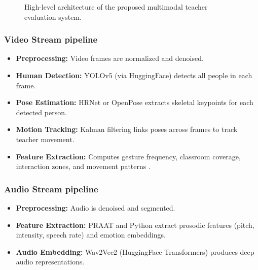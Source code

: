 \begin{figure}[ht]
    \centering
    \caption{High-level architecture of the proposed multimodal teacher evaluation system. }
    \label{fig:multimodal_architecture}
\end{figure}

\subsubsection{Video Stream pipeline}  
\begin{itemize}
    \item \textbf{Preprocessing:} Video frames are normalized and denoised.
    \item \textbf{Human Detection:} YOLOv5 (via HuggingFace) detects all people in each frame.
    \item \textbf{Pose Estimation:} HRNet or OpenPose extracts skeletal keypoints for each detected person.
    \item \textbf{Motion Tracking:} Kalman filtering links poses across frames to track teacher movement.
    \item \textbf{Feature Extraction:} Computes gesture frequency, classroom coverage, interaction zones, and movement patterns \cite{mcneill1992hand}.
\end{itemize}

\subsubsection{Audio Stream pipeline}  
\begin{itemize}
    \item \textbf{Preprocessing:} Audio is denoised and segmented.
    \item \textbf{Feature Extraction:} PRAAT and Python extract prosodic features (pitch, intensity, speech rate) and emotion embeddings.
    \item \textbf{Audio Embedding:} Wav2Vec2 (HuggingFace Transformers) produces deep audio representations.
\end{itemize}

